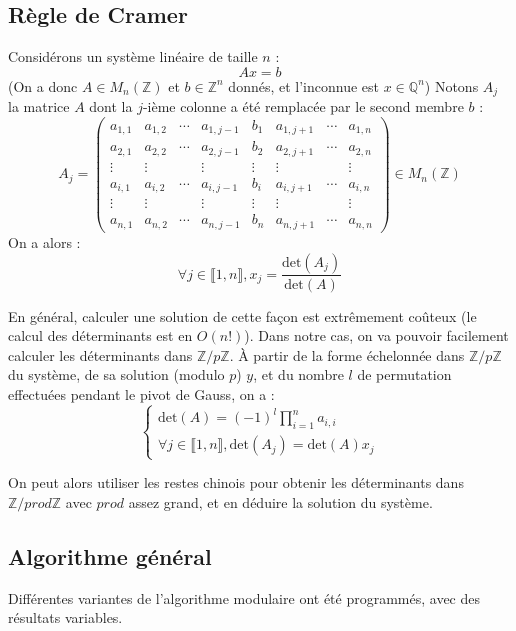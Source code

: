 \documentclass[french]{article}
\begin{document}
\subsection{Règle de Cramer} \label{subsec:cramer}
Considérons un système linéaire de taille $n$ :
$$ A x = b$$
(On a donc $A \in M_n(\mathbb{Z})$ et $b \in \mathbb{Z}^n$ donnés, et l'inconnue est $x \in \mathbb{Q}^n$)
\newline
Notons $A_j$ la matrice $A$ dont la $j$-ième colonne a été remplacée par le second membre $b$ :
\begin{equation*}
	A_j = 
	\begin{pmatrix}
		a_{1,1} & a_{1,2} & \cdots & a_{1,j-1} & b_1 & a_{1,j+1} & \cdots & a_{1,n}\\
		a_{2,1} & a_{2,2} & \cdots & a_{2,j-1} & b_2 & a_{2,j+1} & \cdots & a_{2,n}\\
		\vdots  & \vdots  & & \vdots & \vdots & \vdots & & \vdots\\
		a_{i,1} & a_{i,2} & \cdots & a_{i,j-1} & b_i & a_{i,j+1} & \cdots & a_{i,n}\\
		\vdots  & \vdots  & & \vdots & \vdots & \vdots & & \vdots\\
		a_{n,1} & a_{n,2} & \cdots & a_{n,j-1} & b_n & a_{n,j+1} &\cdots & a_{n,n}
	\end{pmatrix}
	\in M_n(\mathbb{Z})
\end{equation*}
On a alors :
$$ \forall j \in \llbracket1,n\rrbracket, x_j = \frac{\mbox{det}(A_j)}{\mbox{det}(A)}$$
\par
En général, calculer une solution de cette façon est extrêmement coûteux (le calcul des déterminants est en $O(n!)$). Dans notre cas, on va pouvoir facilement calculer les déterminants dans $\mathbb{Z}/p\mathbb{Z}$. À partir de la forme échelonnée dans $\mathbb{Z}/p\mathbb{Z}$ du système, de sa solution (modulo $p$) $y$, et du nombre $l$ de permutation effectuées pendant le pivot de Gauss, on a :
\begin{equation*}
	\begin{cases}
		\mbox{det}(A) = (-1)^l\prod_{i = 1}^na_{i,i}\\
		\forall j \in \llbracket1,n\rrbracket, \mbox{det}(A_j) =  \mbox{det}(A) x_j
	\end{cases}
\end{equation*}
\par
On peut alors utiliser les restes chinois pour obtenir les déterminants dans $\mathbb{Z}/prod\mathbb{Z}$ avec $prod$ assez grand, et en déduire la solution du système.
\subsection{Algorithme général} \label{subsec:modalg}
Différentes variantes de l'algorithme modulaire ont été programmés, avec des résultats variables.
\end{document}
